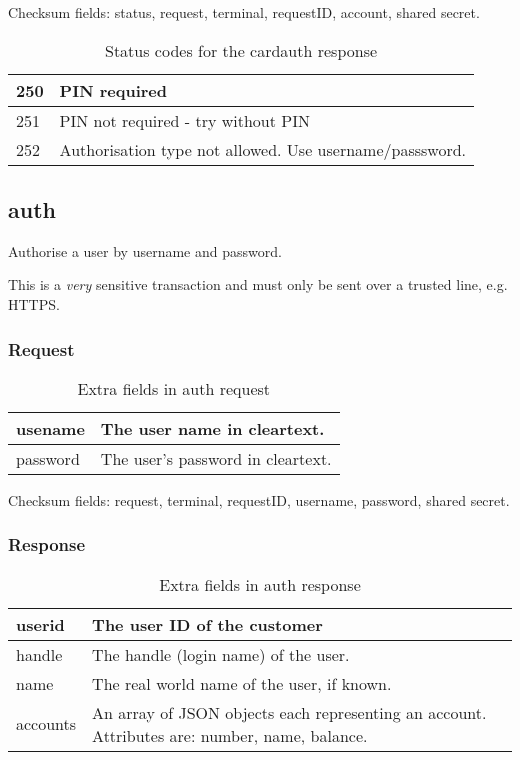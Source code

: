 \documentclass[a4paper,11pt]{article}
\newcommand{\code}[1]
   {\textsf{#1}}
\begin{document}
Checksum fields: status, request, terminal, requestID, account, shared secret.


\begin{table}[!h]
  \begin{tabular}{|l|l|}
    \hline
      250  & PIN required\\\hline
      251  & PIN not required - try without PIN\\\hline
      252  & Authorisation type not allowed. Use username/passsword.\\\hline
  \end{tabular} 
  \caption{Status codes for the \code{cardauth} response}
\end{table}



\subsection{auth}

Authorise a user by username and password.

This is a \emph{very} sensitive transaction and must only be sent
over a trusted line, e.g. HTTPS.

\subsubsection{Request}
\begin{table}[!h]
  \begin{tabular}{|l|l|}
    \hline
    usename & The user name in cleartext.\\\hline
    password & The user's password in cleartext.\\\hline
  \end{tabular} 
  \caption{Extra fields in \code{auth} request}
\end{table}

Checksum fields: request, terminal, requestID, username, password,
shared secret. 

\subsubsection{Response}
\begin{table}[!h]
  \begin{tabular}{|l|l|}
    \hline
      userid  & The user ID of the customer \\\hline
      handle  & The handle (login name) of the user.\\\hline
      name    & The real world name of the user, if known.\\\hline
      accounts & An array of JSON objects each representing
                 an account. Attributes are: number, name, balance.\\\hline
       
  \end{tabular} 
  \caption{Extra fields in \code{auth} response}
\end{table}
\end{document}
